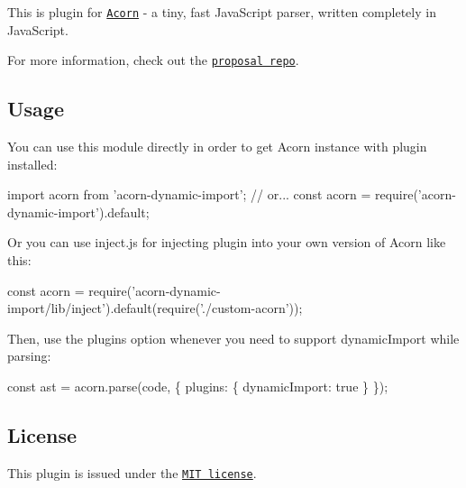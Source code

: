 This is plugin for \href{http://marijnhaverbeke.nl/acorn/}{\tt Acorn} -\/ a tiny, fast Java\+Script parser, written completely in Java\+Script.

For more information, check out the \href{https://github.com/tc39/proposal-dynamic-import}{\tt proposal repo}.

\subsection*{Usage}

You can use this module directly in order to get Acorn instance with plugin installed\+:


\begin{DoxyCode}
import acorn from 'acorn-dynamic-import';
// or...
const acorn = require('acorn-dynamic-import').default;
\end{DoxyCode}


Or you can use {\ttfamily inject.\+js} for injecting plugin into your own version of Acorn like this\+:


\begin{DoxyCode}
const acorn = require('acorn-dynamic-import/lib/inject').default(require('./custom-acorn'));
\end{DoxyCode}


Then, use the {\ttfamily plugins} option whenever you need to support dynamic\+Import while parsing\+:


\begin{DoxyCode}
const ast = acorn.parse(code, \{
  plugins: \{ dynamicImport: true \}
\});
\end{DoxyCode}


\subsection*{License}

This plugin is issued under the \href{./LICENSE}{\tt M\+IT license}. 